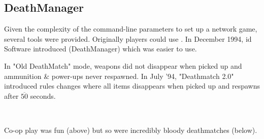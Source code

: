 \subsection{DeathManager}
Given the complexity of the command-line parameters to set up a network game, several tools were provided. Originally players could use . In December 1994, id Software introduced  (DeathManager) which was easier to use.\\
\par
{}
\par
\vspace{-10pt}
In "Old DeathMatch" mode, weapons did not disappear when picked up and ammunition \& power-ups never respawned. In July '94, "Deathmatch 2.0" introduced rules changes where all items disappears when picked up and respawns after $\overline{50}$ seconds.\\
\par












\\
\par
Co-op play was fun (above) but so were incredibly bloody deathmatches (below).\\
\par
{}



